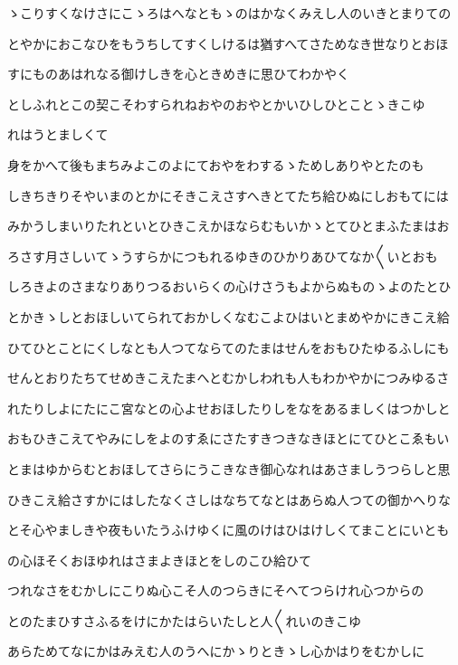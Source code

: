 \documentclass[a4paper,11pt,landscape]{ltjtarticle}
\begin{document}
ゝこりすくなけさにこゝろはへなともゝのはかなくみえし人のいきとまりての
\par\medskip
とやかにおこなひをもうちしてすくしけるは猶すへてさためなき世なりとおほ
\par\medskip
すにものあはれなる御けしきを心ときめきに思ひてわかやく
\par\medskip
としふれとこの契こそわすられねおやのおやとかいひしひとことゝきこゆ
\par\medskip
れはうとましくて
\par\medskip
身をかへて後もまちみよこのよにておやをわするゝためしありやとたのも
\par\medskip
しきちきりそやいまのとかにそきこえさすへきとてたち給ひぬにしおもてには
\par\medskip
みかうしまいりたれといとひきこえかほならむもいかゝとてひとまふたまはお
\par\medskip
ろさす月さしいてゝうすらかにつもれるゆきのひかりあひてなか〱いとおも
\par\medskip
しろきよのさまなりありつるおいらくの心けさうもよからぬものゝよのたとひ
\par\medskip
とかきゝしとおほしいてられておかしくなむこよひはいとまめやかにきこえ給
\par\medskip
ひてひとことにくしなとも人つてならてのたまはせんをおもひたゆるふしにも
\par\medskip
せんとおりたちてせめきこえたまへとむかしわれも人もわかやかにつみゆるさ
\par\medskip
れたりしよにたにこ宮なとの心よせおほしたりしをなをあるましくはつかしと
\par\medskip
おもひきこえてやみにしをよのすゑにさたすきつきなきほとにてひとこゑもい
\par\medskip
とまはゆからむとおほしてさらにうこきなき御心なれはあさましうつらしと思
\par\medskip
ひきこえ給さすかにはしたなくさしはなちてなとはあらぬ人つての御かへりな
\par\medskip
とそ心やましきや夜もいたうふけゆくに風のけはひはけしくてまことにいとも
\par\medskip
の心ほそくおほゆれはさまよきほとをしのこひ給ひて
\par\medskip
つれなさをむかしにこりぬ心こそ人のつらきにそへてつらけれ心つからの
\par\medskip
とのたまひすさふるをけにかたはらいたしと人〱れいのきこゆ
\par\medskip
あらためてなにかはみえむ人のうへにかゝりときゝし心かはりをむかしに
\par\medskip
\end{document}
